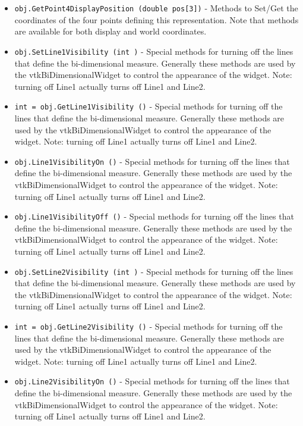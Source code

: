 \begin{itemize}
\item  \verb|obj.GetPoint4DisplayPosition (double pos[3])| -  Methods to Set/Get the coordinates of the four points defining
 this representation. Note that methods are available for both
 display and world coordinates.

\item  \verb|obj.SetLine1Visibility (int )| -  Special methods for turning off the lines that define the bi-dimensional
 measure. Generally these methods are used by the vtkBiDimensionalWidget to
 control the appearance of the widget. Note: turning off Line1 actually turns
 off Line1 and Line2.

\item  \verb|int = obj.GetLine1Visibility ()| -  Special methods for turning off the lines that define the bi-dimensional
 measure. Generally these methods are used by the vtkBiDimensionalWidget to
 control the appearance of the widget. Note: turning off Line1 actually turns
 off Line1 and Line2.

\item  \verb|obj.Line1VisibilityOn ()| -  Special methods for turning off the lines that define the bi-dimensional
 measure. Generally these methods are used by the vtkBiDimensionalWidget to
 control the appearance of the widget. Note: turning off Line1 actually turns
 off Line1 and Line2.

\item  \verb|obj.Line1VisibilityOff ()| -  Special methods for turning off the lines that define the bi-dimensional
 measure. Generally these methods are used by the vtkBiDimensionalWidget to
 control the appearance of the widget. Note: turning off Line1 actually turns
 off Line1 and Line2.

\item  \verb|obj.SetLine2Visibility (int )| -  Special methods for turning off the lines that define the bi-dimensional
 measure. Generally these methods are used by the vtkBiDimensionalWidget to
 control the appearance of the widget. Note: turning off Line1 actually turns
 off Line1 and Line2.

\item  \verb|int = obj.GetLine2Visibility ()| -  Special methods for turning off the lines that define the bi-dimensional
 measure. Generally these methods are used by the vtkBiDimensionalWidget to
 control the appearance of the widget. Note: turning off Line1 actually turns
 off Line1 and Line2.

\item  \verb|obj.Line2VisibilityOn ()| -  Special methods for turning off the lines that define the bi-dimensional
 measure. Generally these methods are used by the vtkBiDimensionalWidget to
 control the appearance of the widget. Note: turning off Line1 actually turns
 off Line1 and Line2.


\end{itemize}
